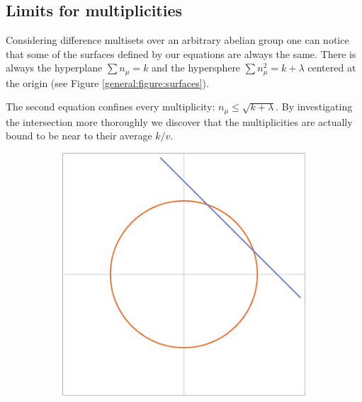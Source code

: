 \subsection{Limits for multiplicities}
    Considering difference multisets over an arbitrary abelian group one can notice that some of the surfaces defined by our equations are always the same. There is always the hyperplane $\sum {n_\mu} = k$ and the hypersphere $\sum n_\mu^2 = k + \lambda$ centered at the origin (see Figure \ref{general:figure:surfaces}). 

The second equation confines every multiplicity: $n_\mu \leq \sqrt{k+\lambda}$. By investigating the intersection more thoroughly we discover that the multiplicities are actually bound to be near to their average $k/v$.

    \begin{figure}
        \centering
        \begin{subfigure}[b]{0.5\textwidth}
            \includegraphics[width=\textwidth]{assets/surfacesIn2D}
        \end{subfigure}%
        ~
        \begin{subfigure}[b]{0.5\textwidth}

\end{subfigure}
\end{figure}
